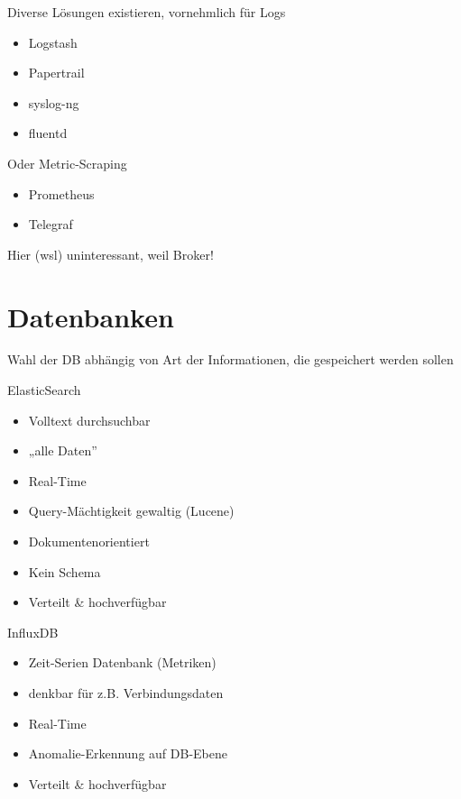 \documentclass{beamer}
\begin{document}
\begin{frame}{\insertsection}
	Diverse Lösungen existieren, vornehmlich für Logs
	\begin{itemize}
		\item Logstash
		\item Papertrail
		\item syslog-ng
		\item fluentd
	\end{itemize}
	Oder Metric-Scraping
	\begin{itemize}
		\item Prometheus
		\item Telegraf
	\end{itemize}
	Hier (wsl) uninteressant, weil Broker!
\end{frame}


\section{Datenbanken}


\begin{frame}{\insertsection}
	\fontsize{20pt}{20pt}\selectfont
	Wahl der DB abhängig von Art der Informationen, die gespeichert werden sollen
\end{frame}


\begin{frame}{ElasticSearch}
	\begin{itemize}
		\setlength\itemsep{1em}
		\item Volltext durchsuchbar
		\item „alle Daten”
		\item Real-Time
		\item Query-Mächtigkeit gewaltig (Lucene)
		\item Dokumentenorientiert
		\item Kein Schema
		\item Verteilt \& hochverfügbar
	\end{itemize}
\end{frame}

\begin{frame}{InfluxDB}
	\begin{itemize}
		\setlength\itemsep{1em}
		\item Zeit-Serien Datenbank (Metriken)
		\item denkbar für z.B. Verbindungsdaten
		\item Real-Time
		\item Anomalie-Erkennung auf DB-Ebene
		\item Verteilt \& hochverfügbar
	\end{itemize}
\end{frame}
\end{document}
